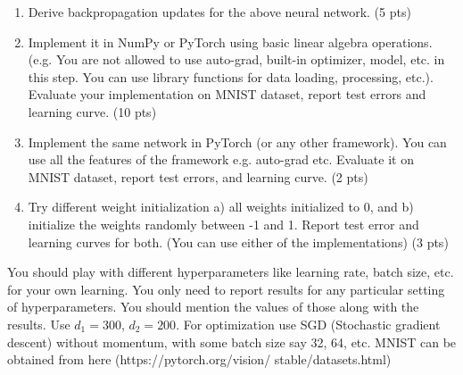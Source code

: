 \documentclass[a4paper]{article}
\theoremstyle{definition}
\begin{document}
\begin{enumerate}
	\item Derive backpropagation updates for the above neural network. (5 pts)
	\item Implement it in NumPy or PyTorch using basic linear algebra operations. (e.g. You are not allowed to use auto-grad, built-in optimizer, model, etc. in this step. You can use library functions for data loading, processing, etc.). Evaluate your implementation on MNIST dataset, report test errors and learning curve. (10 pts)
	\item Implement the same network in PyTorch (or any other framework). You can use all the features of the framework e.g. auto-grad etc. Evaluate it on MNIST dataset, report test errors, and learning curve. (2 pts)
	\item Try different weight initialization a) all weights initialized to 0, and b) initialize the weights randomly between -1 and 1. Report test error and learning curves for both. (You can use either of the implementations) (3 pts)
\end{enumerate}

You should play with different hyperparameters like learning rate, batch size, etc. for your own learning. You only need to report results for any particular setting of hyperparameters. You should mention the values of those along with the results. Use $d_1 = 300$, $d_2 = 200$. For optimization use SGD (Stochastic gradient descent) without momentum, with some batch size say 32, 64, etc. MNIST can be obtained from here (https://pytorch.org/vision/ stable/datasets.html)


\end{document}
